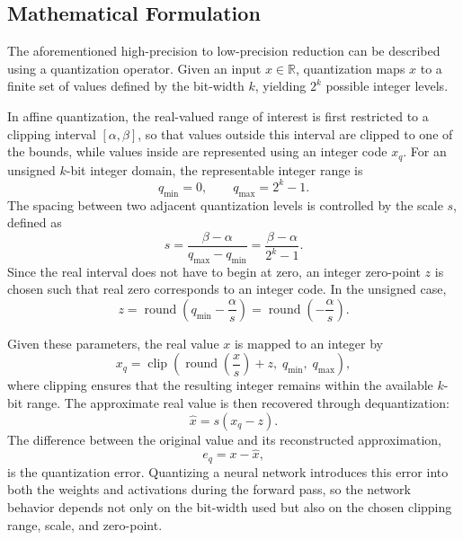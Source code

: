 \subsection{Mathematical Formulation}

The aforementioned high-precision to low-precision reduction can be described using a quantization operator. Given an input $x \in \mathbb{R}$, quantization maps $x$ to a finite set of values defined by the bit-width $k$, yielding $2^k$ possible integer levels.

In affine quantization, the real-valued range of interest is first restricted to a clipping interval $[\alpha, \beta]$, so that values outside this interval are clipped to one of the bounds, while values inside are represented using an integer code $x_q$. For an unsigned $k$-bit integer domain, the representable integer range is
\[
  q_{\min} = 0, \qquad q_{\max} = 2^k - 1.
\]
The spacing between two adjacent quantization levels is controlled by the scale $s$, defined as
\begin{equation}
  s = \frac{\beta - \alpha}{q_{\max} - q_{\min}} = \frac{\beta - \alpha}{2^k - 1}.
  \label{eq:quant_scale}
\end{equation}
Since the real interval does not have to begin at zero, an integer zero-point $z$ is chosen such that real zero corresponds to an integer code. In the unsigned case,
\begin{equation}
  z = \operatorname{round}\!\left(q_{\min} - \frac{\alpha}{s}\right) = \operatorname{round}\!\left(-\frac{\alpha}{s}\right).
  \label{eq:quant_zp}
\end{equation}

Given these parameters, the real value $x$ is mapped to an integer by
\begin{equation}
  x_q = \operatorname{clip}\!\left(\operatorname{round}\!\left(\frac{x}{s}\right) + z,\; q_{\min},\; q_{\max}\right),
  \label{eq:quant_forward}
\end{equation}
where clipping ensures that the resulting integer remains within the available $k$-bit range. The approximate real value is then recovered through dequantization:
\begin{equation}
  \hat{x} = s(x_q - z).
  \label{eq:quant_affine}
\end{equation}
The difference between the original value and its reconstructed approximation,
\begin{equation}
  e_q = x - \hat{x},
  \label{eq:quant_error}
\end{equation}
is the quantization error. Quantizing a neural network introduces this error into both the weights and activations during the forward pass, so the network behavior depends not only on the bit-width used but also on the chosen clipping range, scale, and zero-point.

